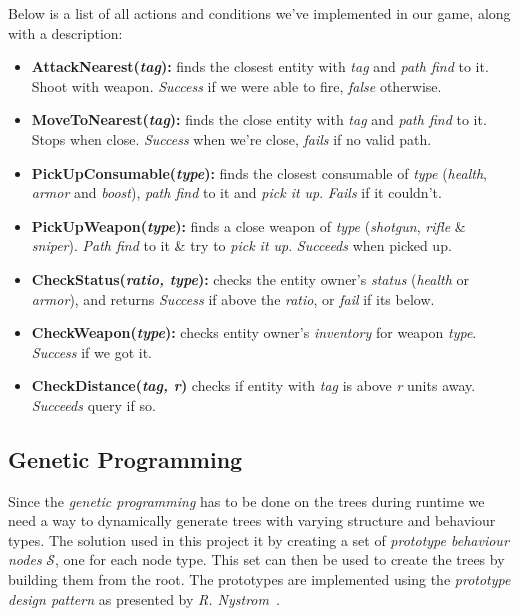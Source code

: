 \documentclass[a4paper, twocolumn]{article}
\begin{document}
        Below is a list of all actions and conditions we've implemented in our game, along with a description:

        \begin{itemize}
            \item{\textbf{AttackNearest(\emph{tag}):} finds the closest entity with \emph{tag} and \emph{path find} to it. Shoot with weapon. \emph{Success} if we were able to fire, \emph{false} otherwise.}
            \item{\textbf{MoveToNearest(\emph{tag}):} finds the close entity with \emph{tag} and \emph{path find} to it. Stops when close. \emph{Success} when we're close, \emph{fails} if no valid path.}
            \item{\textbf{PickUpConsumable(\emph{type}):} finds the closest consumable of \emph{type} (\emph{health}, \emph{armor} and \emph{boost}), \emph{path find} to it and \emph{pick it up}. \emph{Fails} if it couldn't.}
            \item{\textbf{PickUpWeapon(\emph{type}):} finds a close weapon of \emph{type} (\emph{shotgun}, \emph{rifle} \& \emph{sniper}). \emph{Path find} to it \& try to \emph{pick it up}. \emph{Succeeds} when picked up.}
        \end{itemize}
        \begin{itemize}
            \item{\textbf{CheckStatus(\emph{ratio, type}):} checks the entity owner's \emph{status} (\emph{health} or \emph{armor}), and returns \emph{Success} if above the \emph{ratio}, or \emph{fail} if its below.}
            \item{\textbf{CheckWeapon(\emph{type}):} checks entity owner's \emph{inventory} for weapon \emph{type}. \emph{Success} if we got it.}
            \item{\textbf{CheckDistance(\emph{tag, r})} checks if entity with \emph{tag} is above \emph{r} units away. \emph{Succeeds} query if so.}
        \end{itemize}

        \clearpage

        \subsection{Genetic Programming} \label{sec:genetic_programming_implementation}

        Since the \textit{genetic programming} has to be done on the trees during runtime we need a way to dynamically generate trees with varying structure and behaviour types. The solution used in this project it by creating a set of \textit{prototype behaviour nodes} \(\mathcal{S}\), one for each node type. This set can then be used to create the trees by building them from the root. The prototypes are implemented using the \textit{prototype design pattern} as presented by \textit{R. Nystrom}~\cite{nystrom2014game}.
\end{document}
